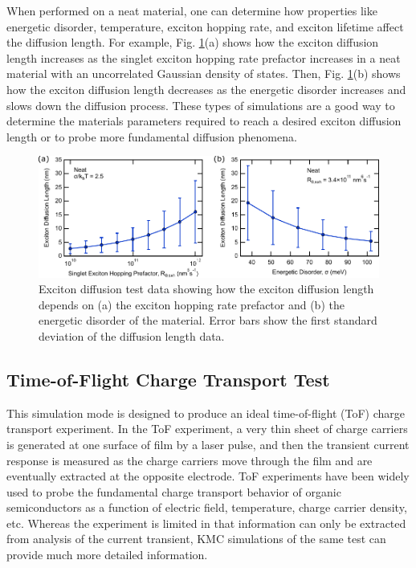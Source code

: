 \documentclass[%
 reprint,onecolumn,notitlepage,
superscriptaddress,longbibliography,
 amsmath,amssymb,
 aps,rmp,floatfix,
]{revtex4-1}
\begin{document}
When performed on a neat material, one can determine how properties like energetic disorder, temperature, exciton hopping rate, and exciton lifetime affect the diffusion length.
For example, Fig. \ref{fig:exciton_diffusion_example}(a) shows how the exciton diffusion length increases as the singlet exciton hopping rate prefactor increases in a neat material with an uncorrelated Gaussian density of states.
Then, Fig. \ref{fig:exciton_diffusion_example}(b) shows how the exciton diffusion length decreases as the energetic disorder increases and slows down the diffusion process.
These types of simulations are a good way to determine the materials parameters required to reach a desired exciton diffusion length or to probe more fundamental diffusion phenomena.

\begin{figure}[h]
    \centering
    \includegraphics{Exciton_diffusion_example_data.pdf}
    \caption{Exciton diffusion test data showing how the exciton diffusion length depends on (a) the exciton hopping rate prefactor and (b) the energetic disorder of the material. Error bars show the first standard deviation of the diffusion length data.}
    \label{fig:exciton_diffusion_example}
\end{figure}

\subsection{Time-of-Flight Charge Transport Test}

This simulation mode is designed to produce an ideal time-of-flight (ToF) charge transport experiment.
In the ToF experiment, a very thin sheet of charge carriers is generated at one surface of film by a laser pulse, and then the transient current response is measured as the charge carriers move through the film and are eventually extracted at the opposite electrode.
ToF experiments have been widely used to probe the fundamental charge transport behavior of organic semiconductors as a function of electric field, temperature, charge carrier density, etc.\cite{baessler1993pssb}
Whereas the experiment is limited in that information can only be extracted from analysis of the current transient, KMC simulations of the same test can provide much more detailed information.
\end{document}
